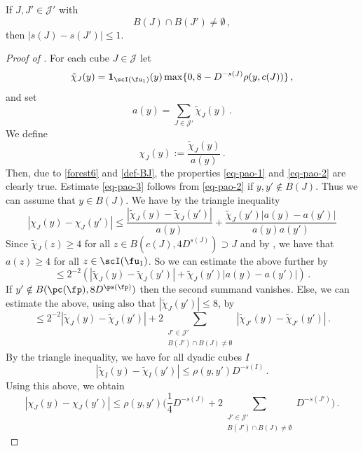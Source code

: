     \begin{lemma}
        \label{moderate-scale-change}
        \leanok

        If $J, J' \in \mathcal{J'}$ with
        $$
            B(J) \cap B(J') \ne \emptyset\,,
        $$
        then $|s(J) - s(J')| \le 1$.
    \end{lemma}

    \begin{proof}[Proof of ]
        \leanok
        For each cube $J \in \mathcal{J}$ let
        $$
            \tilde\chi_J(y) = \mathbf{1}_{\scI(\fu_1)}(y)\max\{0, 8 - D^{-s(J)} \rho(y, c(J))\}\,,
        $$
        and set
        $$
            a(y) = \sum_{J \in \mathcal{J}'} \tilde \chi_J(y)\,.
        $$
        We define
        \[
            \chi_J(y) := \frac{\tilde \chi_J(y)}{a(y)}\,.
        \]
        Then, due to \eqref{forest6} and \eqref{def-BJ}, the properties \eqref{eq-pao-1} and \eqref{eq-pao-2} are clearly true. Estimate \eqref{eq-pao-3} follows from \eqref{eq-pao-2} if $y, y' \notin B(J)$. Thus we can assume that $y \in B(J)$. We have by the triangle inequality
        $$
            |\chi_J(y) - \chi_J(y')| \le \frac{|\tilde \chi_J(y) - \tilde \chi_J(y')|}{a(y)} + \frac{\tilde \chi_J(y')|a(y) - a(y')|}{a(y)a(y')}
        $$
        Since $\tilde \chi_J(z) \ge 4$ for all $z \in B(c(J),4D^{s(J)}) \supset J$ and by , we have that $a(z) \ge 4$ for all $z \in \scI(\fu_1)$. So we can estimate the above further by
        $$
            \le 2^{-2}(|\tilde \chi_J(y) - \tilde \chi_J(y')| + \tilde \chi_J(y')|a(y) - a(y')|)\,.
        $$
        If $y' \notin B(\pc(\fp), 8D^{\ps(\fp)})$ then the second summand vanishes. Else, we can estimate the above, using also that $|\tilde \chi_J(y')| \le 8$, by
        $$
            \le 2^{-2} |\tilde \chi_J(y) - \tilde \chi_J(y')| + 2 \sum_{\substack{J' \in \mathcal{J}'\\ B(J') \cap B(J) \ne \emptyset}}|\tilde \chi_{J'}(y) - \tilde \chi_{J'} (y')|\,.
        $$
        By the triangle inequality, we have for all dyadic cubes $I$
        $$
            |\tilde \chi_I(y) - \tilde \chi_I(y')| \le \rho(y, y') D^{-s(I)}\,.
        $$
        Using this above, we obtain
        $$
            |\chi_J(y) - \chi_J(y')| \le \rho(y,y') \Big( \frac{1}{4} D^{-s(J)} + 2 \sum_{\substack{J' \in \mathcal{J}'\\ B(J') \cap B(J) \ne \emptyset}} D^{-s(J')}\Big)\,.
$$
\end{proof}
